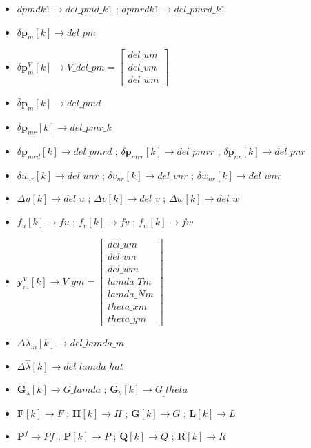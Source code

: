 \documentclass[UTF8,12pt,a4paper]{ctexart}
\begin{document}
\begin{itemize}[itemsep=6pt]
\item $dpmdk1 \to del\_pmd\_k1$ \;;\; $dpmrdk1 \to del\_pmrd\_k1$

\item $\delta\mathbf{p}_m[k] \to del\_pm$

\item $\delta\mathbf{p}_m^V[k] \to V\_del\_pm = \begin{bmatrix} del\_um \\ del\_vm \\ del\_wm \end{bmatrix}$

\item $\bar{\delta}\mathbf{p}_m[k] \to del\_pmd$

\item $\delta\mathbf{p}_{mr}[k] \to del\_pmr\_k$

\item $\delta\mathbf{p}_{mrd}[k] \to del\_pmrd$ \;;\;
$\delta\mathbf{p}_{mrr}[k] \to del\_pmrr$ \;;\;
$\delta\mathbf{p}_{nr}[k] \to del\_pnr$

\item $\delta u_{nr}[k] \to del\_unr$ \;;\;
$\delta v_{nr}[k] \to del\_vnr$ \;;\;
$\delta w_{nr}[k] \to del\_wnr$

\item $\Delta u[k] \to del\_u$ \;;\;
$\Delta v[k] \to del\_v$ \;;\;
$\Delta w[k] \to del\_w$

\item $f_u[k] \to fu$ \;;\;
$f_v[k] \to fv$ \;;\;
$f_w[k] \to fw$

\item $\mathbf{y}_m^V[k] \to V\_ym = \begin{bmatrix} del\_um \\ del\_vm \\ del\_wm \\ lamda\_Tm \\ lamda\_Nm \\ theta\_xm \\ theta\_ym \end{bmatrix}$

\item $\Delta\lambda_m[k] \to del\_lamda\_m$

\item $\Delta\hat{\lambda}[k] \to del\_lamda\_hat$

\item $\mathbf{G}_\lambda[k] \to G\_lamda$ \;;\;
$\mathbf{G}_\theta[k] \to G_\_theta$

\item $\mathbf{F}[k] \to F$ \;;\;
$\mathbf{H}[k] \to H$ \;;\;
$\mathbf{G}[k] \to G$ \;;\;
$\mathbf{L}[k] \to L$

\item $\mathbf{P}^f \to Pf$ \;;\;
$\mathbf{P}[k] \to P$ \;;\;
$\mathbf{Q}[k] \to Q$ \;;\;
$\mathbf{R}[k] \to R$

\end{itemize}
\end{document}
